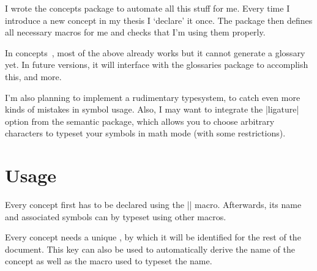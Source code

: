 \documentclass[a4paper]{packagedoc}
\begin{document}
I wrote the \textsf{concepts} package to automate all this stuff for me. Every
time I introduce a new concept in my thesis I `declare' it once. The package
then defines all necessary macros for me and checks that I'm using them
properly.

In \textsf{concepts}~\fileversion{}, most of the above already works but it
cannot generate a glossary yet. In future versions, it will interface with
the \textsf{glossaries} package to accomplish this, and more.

I'm also planning to implement a rudimentary typesystem, to catch even more
kinds of mistakes in symbol usage. Also, I may want to integrate the
|ligature| option from the \textsf{semantic} package, which allows you to
choose arbitrary characters to typeset your symbols in math mode (with some
restrictions).

\section{Usage}                                                                %

Every concept first has to be declared using the |\NewConcept| macro.
Afterwards, its name and associated symbols can by typeset using other macros.



Every concept needs a unique , by which it will be identified
for the rest of the document. This key can also be used to automatically
derive the name of the concept as well as the macro used to typeset the name.
\end{document}
